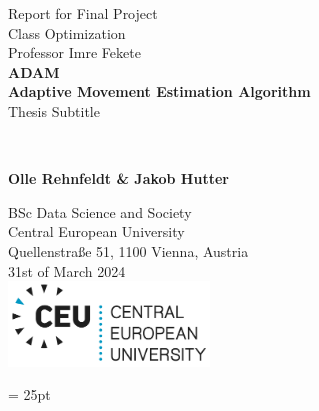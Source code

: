 \documentclass[journal]{IEEEtran}
\begin{document}
\begin{titlepage}
   \begin{center}
        \vfill
        Report for Final Project\\
        Class Optimization\\
        Professor Imre Fekete
        \vfill\noindent\hrulefill \\
        \vspace*{1cm}
        \textbf{\huge ADAM}\\
        \vspace{0.2cm}
        \textbf{\huge Adaptive Movement Estimation Algorithm }
        \vspace{0.5cm}
        \\
        Thesis Subtitle
        
        \noindent\hrulefill \\

       
            
       \vspace{1.5cm}

       \textbf{Olle Rehnfeldt \& Jakob Hutter}

       \vfill
            
       
            
       \vspace{2cm}
       BSc Data Science and Society\\
       Central European University\\
       Quellenstraße 51, 1100 Vienna, Austria\\
       31st of March 2024\\
       \vspace{1.5cm}
       \includegraphics[width=0.4\textwidth]{figures/CEU_Logo_RGB_DualColor.png}
       
            
   \end{center}
\end{titlepage}

\pagestyle{fancy}
\headheight = 25pt
\fancyhf{}
\fancyfoot[C]{\thepage}
\newpage
\end{document}
